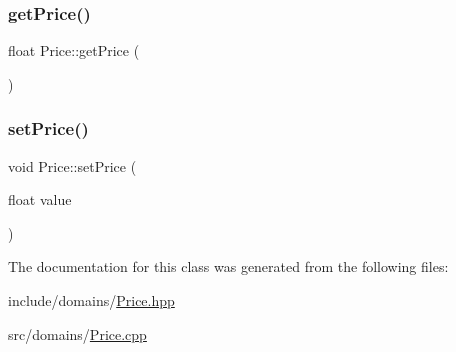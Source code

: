 \subsubsection{\texorpdfstring{getPrice()}{getPrice()}}
{\footnotesize\ttfamily float Price\+::get\+Price (\begin{DoxyParamCaption}{ }\end{DoxyParamCaption})}

\mbox{\label{class_price_a66ba29e9ab95f10b5d21b171317045c3}} 
\subsubsection{\texorpdfstring{setPrice()}{setPrice()}}
{\footnotesize\ttfamily void Price\+::set\+Price (\begin{DoxyParamCaption}\item[{float}]{value }\end{DoxyParamCaption})}



The documentation for this class was generated from the following files\+:\begin{DoxyCompactItemize}
\item 
include/domains/\mbox{\hyperlink{_price_8hpp}{Price.\+hpp}}\item 
src/domains/\mbox{\hyperlink{_price_8cpp}{Price.\+cpp}}\end{DoxyCompactItemize}
